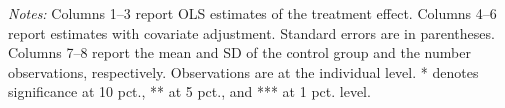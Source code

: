 \begin{table}[h]
{\begin{threeparttable}
\begin{tabular}{l*{8}{c}}
\bottomrule \end{tabular} \begin{tablenotes}[flushleft] \footnotesize \item \emph{Notes:} Columns 1--3 report OLS estimates of the treatment effect. Columns 4--6 report estimates with covariate adjustment. Standard errors are in parentheses. Columns 7--8 report the mean and SD of the control group and the number observations, respectively. Observations are at the individual level. * denotes significance at 10 pct., ** at 5 pct., and *** at 1 pct. level. \end{tablenotes} \end{threeparttable} } \end{table}

